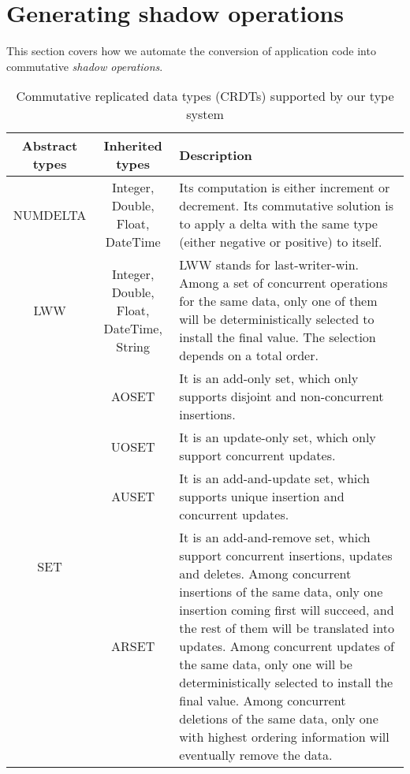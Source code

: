 \section{Generating shadow operations}
\label{ch:sieve:sect:commute}

This section covers how we automate the conversion of application code into commutative \emph{shadow operations}.

\begin{table*}[t!]
\centering
\begin{tabular}{|c|c|p{8cm}|}
\hline
Abstract types & Inherited types & Description \\
\hline
NUMDELTA & Integer, Double, Float, DateTime &
  Its computation is either increment or decrement. Its commutative solution
  is to apply a delta with the same type (either negative or positive) to itself.  \\ \hline
LWW & Integer, Double, Float, DateTime, String &
  LWW stands for last-writer-win. Among a set of concurrent operations
  for the same data, only one of them will be deterministically selected
  to install the final value. The selection depends on a total order.\\ \hline
\multirow{4}{*}{SET} & AOSET & It is an add-only set, which only supports disjoint and non-concurrent
          insertions.\\
 \cline{2-3}
&  UOSET & It is an update-only set, which only support concurrent updates.\\
 \cline{2-3}
&  AUSET & It is an add-and-update set, which supports unique insertion and concurrent updates.\\
 \cline{2-3}
&  ARSET & It is an add-and-remove set, which support concurrent insertions, updates
            and deletes. Among concurrent insertions of the same data, only one insertion coming first will
            succeed, and the rest of them will be translated into updates. Among concurrent updates of the same
            data, only one will be deterministically selected to install the final value. Among concurrent
            deletions of the same data, only one with highest ordering information will eventually remove the
            data.\\
\hline
\end{tabular}
\caption{Commutative replicated data types (CRDTs) supported by our type system}
\label{tab:crdts}
\end{table*}
\fi

